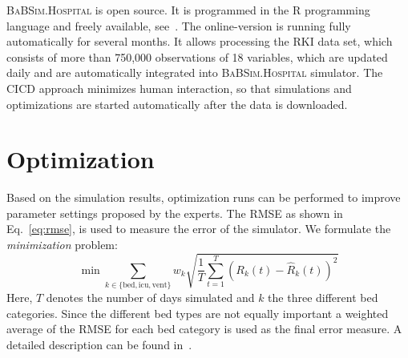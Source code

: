 \documentclass[conference]{IEEEtran}
\newcommand{\babsimhospital}{\textsc{BaBSim.Hospital}\xspace}
\begin{document}

\babsimhospital is open source. It is programmed in the R programming language and freely available, see~\cite{bart20t}.
The online-version is running fully automatically for several months.
It allows processing  the \gls{RKI} data set, which consists of more than 
750,000 observations of 18 variables, which are updated daily and are automatically integrated into \babsimhospital simulator. 
The \gls{CICD} approach minimizes human interaction, so that simulations and optimizations are
started automatically after the data is downloaded.

\section{Optimization}\label{sec:optim}
Based on the simulation results, optimization runs can be performed to improve parameter settings proposed by the experts. 
The \gls{RMSE} as shown in Eq.~\ref{eq:rmse}, is used to measure the error of the simulator.
We formulate the \emph{minimization} problem:
\begin{equation}\label{eq:rmse}
  \min 
  \sum_{k\in\{\text{bed},\text{icu},\text{vent}\}}
    w_k  \sqrt{\frac{1}{T} \sum_{t=1}^T \left(R_k(t) - \hat{R}_k(t)\right)^2}
\end{equation}
Here, $T$ denotes the number of days simulated and $k$ the three different bed categories.
Since the different bed types are not equally important a weighted average of the \gls{RMSE} for each bed category is used as the final error measure.
A detailed description can be found in~\citep{Bart20j}.
\end{document}
